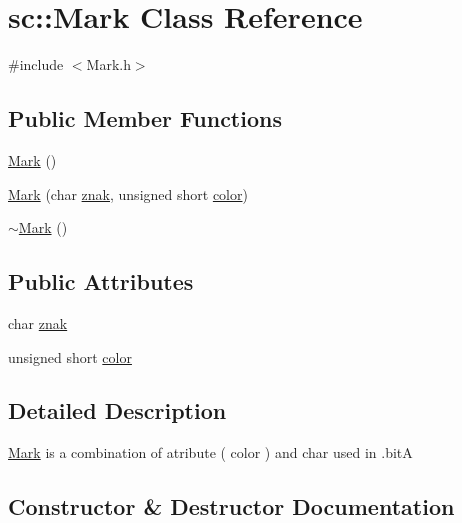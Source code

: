 \hypertarget{classsc_1_1_mark}{}\section{sc\+::Mark Class Reference}
\label{classsc_1_1_mark}


{\ttfamily \#include $<$Mark.\+h$>$}

\subsection*{Public Member Functions}
\begin{DoxyCompactItemize}
\item 
\mbox{\hyperlink{classsc_1_1_mark_ace8e7e146828a4bfa3d94abd3a10d639}{Mark}} ()
\item 
\mbox{\hyperlink{classsc_1_1_mark_ab40174ee9848d0cbec1a3357e5431de0}{Mark}} (char \mbox{\hyperlink{classsc_1_1_mark_a0b63d459e3ba442f7a22ce5b8e4d4e21}{znak}}, unsigned short \mbox{\hyperlink{classsc_1_1_mark_a2351b074fb3a47fe1f33e917ac7734b2}{color}})
\item 
\mbox{\hyperlink{classsc_1_1_mark_a36a64089bd6fdca80b5356f59e62c1b3}{$\sim$\+Mark}} ()
\end{DoxyCompactItemize}
\subsection*{Public Attributes}
\begin{DoxyCompactItemize}
\item 
char \mbox{\hyperlink{classsc_1_1_mark_a0b63d459e3ba442f7a22ce5b8e4d4e21}{znak}}
\item 
unsigned short \mbox{\hyperlink{classsc_1_1_mark_a2351b074fb3a47fe1f33e917ac7734b2}{color}}
\end{DoxyCompactItemize}


\subsection{Detailed Description}
\mbox{\hyperlink{classsc_1_1_mark}{Mark}} is a combination of atribute ( color ) and char used in .bitA 

\subsection{Constructor \& Destructor Documentation}
\mbox{\label{classsc_1_1_mark_ace8e7e146828a4bfa3d94abd3a10d639}} 
